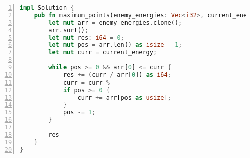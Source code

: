 \begin{figure*}
\centering
\begin{lstlisting}[breaklines=true, language=Rust, frame=shadowbox, numbers=left,]
impl Solution {
    pub fn maximum_points(enemy_energies: Vec<i32>, current_energy: i32) -> i64 {
        let mut arr = enemy_energies.clone();
        arr.sort();
        let mut res: i64 = 0;
        let mut pos = arr.len() as isize - 1;
        let mut curr = current_energy;

        while pos >= 0 && arr[0] <= curr {
            res += (curr / arr[0]) as i64;
            curr = curr %
            if pos >= 0 {
                curr += arr[pos as usize];
            }
            pos -= 1;
        }

        res
    }
}
\end{lstlisting}
\label{lst:rust-fix-underflow}
\end{figure*}
